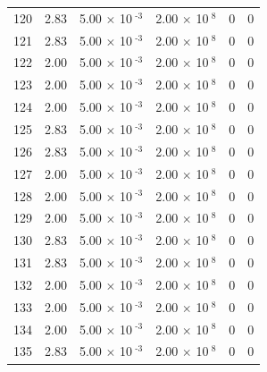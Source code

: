 \documentclass[a4paper,11pt]{article}
\begin{document}
\begin{center}
\begin{longtable}{|R{1.5cm}|R{2.4cm}|R{2.4cm}|R{2.4cm}|R{2.4cm}|R{2.4cm}|}
  120 &   2.83  &         5.00 $\times$ 10$^{\text{          -3}}$  &         2.00 $\times$ 10$^{\text{           8}}$  & 0  & 0 \\
  121 &   2.83  &         5.00 $\times$ 10$^{\text{          -3}}$  &         2.00 $\times$ 10$^{\text{           8}}$  & 0  & 0 \\
  122 &   2.00  &         5.00 $\times$ 10$^{\text{          -3}}$  &         2.00 $\times$ 10$^{\text{           8}}$  & 0  & 0 \\
  123 &   2.00  &         5.00 $\times$ 10$^{\text{          -3}}$  &         2.00 $\times$ 10$^{\text{           8}}$  & 0  & 0 \\
  124 &   2.00  &         5.00 $\times$ 10$^{\text{          -3}}$  &         2.00 $\times$ 10$^{\text{           8}}$  & 0  & 0 \\
  125 &   2.83  &         5.00 $\times$ 10$^{\text{          -3}}$  &         2.00 $\times$ 10$^{\text{           8}}$  & 0  & 0 \\
  126 &   2.83  &         5.00 $\times$ 10$^{\text{          -3}}$  &         2.00 $\times$ 10$^{\text{           8}}$  & 0  & 0 \\
  127 &   2.00  &         5.00 $\times$ 10$^{\text{          -3}}$  &         2.00 $\times$ 10$^{\text{           8}}$  & 0  & 0 \\
  128 &   2.00  &         5.00 $\times$ 10$^{\text{          -3}}$  &         2.00 $\times$ 10$^{\text{           8}}$  & 0  & 0 \\
  129 &   2.00  &         5.00 $\times$ 10$^{\text{          -3}}$  &         2.00 $\times$ 10$^{\text{           8}}$  & 0  & 0 \\
  130 &   2.83  &         5.00 $\times$ 10$^{\text{          -3}}$  &         2.00 $\times$ 10$^{\text{           8}}$  & 0  & 0 \\
  131 &   2.83  &         5.00 $\times$ 10$^{\text{          -3}}$  &         2.00 $\times$ 10$^{\text{           8}}$  & 0  & 0 \\
  132 &   2.00  &         5.00 $\times$ 10$^{\text{          -3}}$  &         2.00 $\times$ 10$^{\text{           8}}$  & 0  & 0 \\
  133 &   2.00  &         5.00 $\times$ 10$^{\text{          -3}}$  &         2.00 $\times$ 10$^{\text{           8}}$  & 0  & 0 \\
  134 &   2.00  &         5.00 $\times$ 10$^{\text{          -3}}$  &         2.00 $\times$ 10$^{\text{           8}}$  & 0  & 0 \\
  135 &   2.83  &         5.00 $\times$ 10$^{\text{          -3}}$  &         2.00 $\times$ 10$^{\text{           8}}$  & 0  & 0 \\

\end{longtable}
\end{center}
\end{document}
